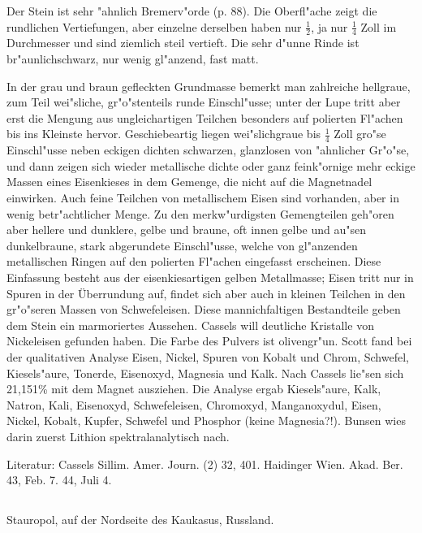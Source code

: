 \documentclass[a4paper, 11pt, oneside]{article}
\begin{document}
Der Stein ist sehr "ahnlich Bremerv"orde (p. 88). Die Oberfl"ache zeigt die rundlichen Vertiefungen, aber einzelne derselben haben nur $\mathfrak{\frac{1}{2}}$, ja nur $\mathfrak{\frac{1}{4}}$ Zoll im Durchmesser und sind ziemlich steil vertieft. Die sehr d"unne Rinde ist br"aunlichschwarz, nur wenig gl"anzend, fast matt.

In der grau und braun gefleckten Grundmasse bemerkt man zahlreiche hellgraue, zum Teil wei"sliche, gr"o"stenteils runde Einschl"usse; unter der Lupe tritt aber erst die Mengung aus ungleichartigen Teilchen besonders auf polierten Fl"achen bis ins Kleinste hervor. Geschiebeartig liegen wei"slichgraue bis $\mathfrak{\frac{1}{4}}$ Zoll gro"se Einschl"usse neben eckigen dichten schwarzen, glanzlosen von "ahnlicher Gr"o"se, und dann zeigen sich wieder metallische dichte oder ganz feink"ornige mehr eckige Massen eines Eisenkieses in dem Gemenge, die nicht auf die Magnetnadel einwirken. Auch feine Teilchen von metallischem Eisen sind vorhanden, aber in wenig betr"achtlicher Menge. Zu den merkw"urdigsten Gemengteilen geh"oren aber hellere und dunklere, gelbe und braune, oft innen gelbe und au"sen dunkelbraune, stark abgerundete Einschl"usse, welche von gl"anzenden metallischen Ringen auf den polierten Fl"achen eingefasst erscheinen. Diese Einfassung besteht aus der eisenkiesartigen gelben Metallmasse; Eisen tritt nur in Spuren in der Überrundung auf, findet sich aber auch in kleinen Teilchen in den gr"o"seren Massen von Schwefeleisen. Diese mannichfaltigen Bestandteile geben dem Stein ein marmoriertes Aussehen. Cassels will deutliche Kristalle von Nickeleisen gefunden haben. Die Farbe des Pulvers ist olivengr"un. Scott fand bei der qualitativen Analyse Eisen, Nickel, Spuren von Kobalt und Chrom, Schwefel, Kiesels"aure, Tonerde, Eisenoxyd, Magnesia und Kalk. Nach Cassels lie"sen sich 21,151\% mit dem Magnet ausziehen. Die Analyse ergab Kiesels"aure, Kalk, Natron, Kali, Eisenoxyd, Schwefeleisen, Chromoxyd, Manganoxydul, Eisen, Nickel, Kobalt, Kupfer, Schwefel und Phosphor (keine Magnesia?!). Bunsen wies darin zuerst Lithion spektralanalytisch nach.

\normalsize
Literatur: Cassels Sillim. Amer. Journ. (2) 32, 401. Haidinger Wien. Akad. Ber. 43, Feb. 7. 44, Juli 4.

\subsection{}
\LARGE
\paragraph{}
Stauropol, auf der Nordseite des Kaukasus, Russland.
\end{document}
